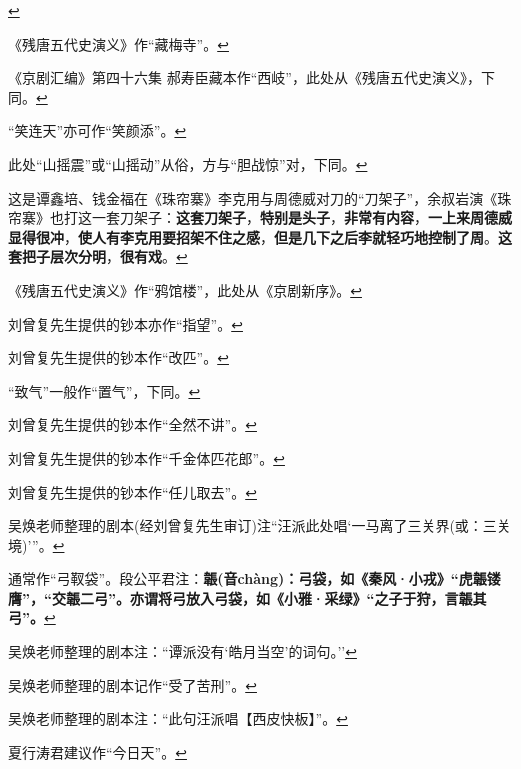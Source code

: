   \protect\hyperlink{fnref394}{↩}
\item
  \leavevmode\hypertarget{fn395}{}%
  《残唐五代史演义》作``藏梅寺''。\protect\hyperlink{fnref395}{↩}
\item
  \leavevmode\hypertarget{fn396}{}%
  《京剧汇编》第四十六集
  郝寿臣藏本作``西岐''，此处从《残唐五代史演义》，下同。\protect\hyperlink{fnref396}{↩}
\item
  \leavevmode\hypertarget{fn397}{}%
  ``笑连天''亦可作``笑颜添''。\protect\hyperlink{fnref397}{↩}
\item
  \leavevmode\hypertarget{fn398}{}%
  此处``山摇震''或``山摇动''从俗，方与``胆战惊''对，下同。\protect\hyperlink{fnref398}{↩}
\item
  \leavevmode\hypertarget{fn399}{}%
  这是谭鑫培、钱金福在《珠帘寨》李克用与周德威对刀的``刀架子''，余叔岩演《珠帘寨》也打这一套刀架子：\textbf{这套刀架子}，\textbf{特别是头子}，\textbf{非常有内容}，\textbf{一上来周德威显得很冲}，\textbf{使人有李克用要招架不住之感}，\textbf{但是几下之后李就轻巧地控制了周}。\textbf{这套把子层次分明}，\textbf{很有戏}。\protect\hyperlink{fnref399}{↩}
\item
  \leavevmode\hypertarget{fn400}{}%
  《残唐五代史演义》作``鸦馆楼''，此处从《京剧新序》。\protect\hyperlink{fnref400}{↩}
\item
  \leavevmode\hypertarget{fn401}{}%
  刘曾复先生提供的钞本亦作``指望''。\protect\hyperlink{fnref401}{↩}
\item
  \leavevmode\hypertarget{fn402}{}%
  刘曾复先生提供的钞本作``改匹''。\protect\hyperlink{fnref402}{↩}
\item
  \leavevmode\hypertarget{fn403}{}%
  ``致气''一般作``置气''，下同。\protect\hyperlink{fnref403}{↩}
\item
  \leavevmode\hypertarget{fn404}{}%
  刘曾复先生提供的钞本作``全然不讲''。\protect\hyperlink{fnref404}{↩}
\item
  \leavevmode\hypertarget{fn405}{}%
  刘曾复先生提供的钞本作``千金体匹花郎''。\protect\hyperlink{fnref405}{↩}
\item
  \leavevmode\hypertarget{fn406}{}%
  刘曾复先生提供的钞本作``任儿取去''。\protect\hyperlink{fnref406}{↩}
\item
  \leavevmode\hypertarget{fn407}{}%
  吴焕老师整理的剧本(经刘曾复先生审订)注``汪派此处唱`一马离了三关界(或：三关境)'''。\protect\hyperlink{fnref407}{↩}
\item
  \leavevmode\hypertarget{fn408}{}%
  通常作``弓靫袋''。段公平君注：\textbf{韔(音chàng)：弓袋，如《秦风·小戎》``虎韔镂膺''，``交韔二弓''。亦谓将弓放入弓袋，如《小雅·采绿》``之子于狩，言韔其弓''。}\protect\hyperlink{fnref408}{↩}
\item
  \leavevmode\hypertarget{fn409}{}%
  吴焕老师整理的剧本注：``谭派没有`皓月当空'的词句。''\protect\hyperlink{fnref409}{↩}
\item
  \leavevmode\hypertarget{fn410}{}%
  吴焕老师整理的剧本记作``受了苦刑''。\protect\hyperlink{fnref410}{↩}
\item
  \leavevmode\hypertarget{fn411}{}%
  吴焕老师整理的剧本注：``此句汪派唱【西皮快板】''。\protect\hyperlink{fnref411}{↩}
\item
  \leavevmode\hypertarget{fn412}{}%
  夏行涛君建议作``今日天''。\protect\hyperlink{fnref412}{↩}
